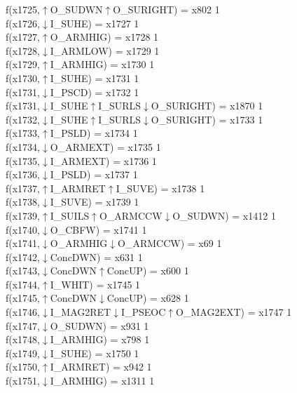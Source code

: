 f(x1725,$\uparrow$O\_SUDWN$\uparrow$O\_SURIGHT) = x802 {1} \\
f(x1726,$\downarrow$I\_SUHE) = x1727 {1} \\
f(x1727,$\uparrow$O\_ARMHIG) = x1728 {1} \\
f(x1728,$\downarrow$I\_ARMLOW) = x1729 {1} \\
f(x1729,$\uparrow$I\_ARMHIG) = x1730 {1} \\
f(x1730,$\uparrow$I\_SUHE) = x1731 {1} \\
f(x1731,$\downarrow$I\_PSCD) = x1732 {1} \\
f(x1731,$\downarrow$I\_SUHE$\uparrow$I\_SURLS$\downarrow$O\_SURIGHT) = x1870 {1} \\
f(x1732,$\downarrow$I\_SUHE$\uparrow$I\_SURLS$\downarrow$O\_SURIGHT) = x1733 {1} \\
f(x1733,$\uparrow$I\_PSLD) = x1734 {1} \\
f(x1734,$\downarrow$O\_ARMEXT) = x1735 {1} \\
f(x1735,$\downarrow$I\_ARMEXT) = x1736 {1} \\
f(x1736,$\downarrow$I\_PSLD) = x1737 {1} \\
f(x1737,$\uparrow$I\_ARMRET$\uparrow$I\_SUVE) = x1738 {1} \\
f(x1738,$\downarrow$I\_SUVE) = x1739 {1} \\
f(x1739,$\uparrow$I\_SUILS$\uparrow$O\_ARMCCW$\downarrow$O\_SUDWN) = x1412 {1} \\
f(x1740,$\downarrow$O\_CBFW) = x1741 {1} \\
f(x1741,$\downarrow$O\_ARMHIG$\downarrow$O\_ARMCCW) = x69 {1} \\
f(x1742,$\downarrow$ConcDWN) = x631 {1} \\
f(x1743,$\downarrow$ConcDWN$\uparrow$ConcUP) = x600 {1} \\
f(x1744,$\uparrow$I\_WHIT) = x1745 {1} \\
f(x1745,$\uparrow$ConcDWN$\downarrow$ConcUP) = x628 {1} \\
f(x1746,$\downarrow$I\_MAG2RET$\downarrow$I\_PSEOC$\uparrow$O\_MAG2EXT) = x1747 {1} \\
f(x1747,$\downarrow$O\_SUDWN) = x931 {1} \\
f(x1748,$\downarrow$I\_ARMHIG) = x798 {1} \\
f(x1749,$\downarrow$I\_SUHE) = x1750 {1} \\
f(x1750,$\uparrow$I\_ARMRET) = x942 {1} \\
f(x1751,$\downarrow$I\_ARMHIG) = x1311 {1} \\
